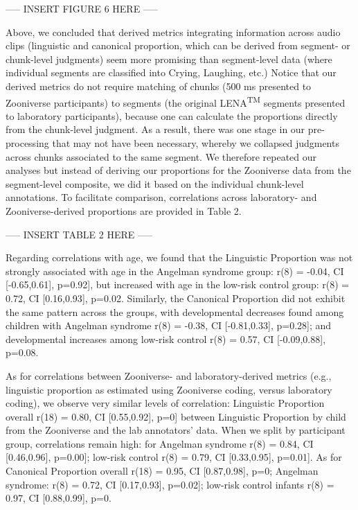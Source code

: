 \documentclass[english,,man]{apa6}
\begin{document}
----- INSERT FIGURE 6 HERE -----

Above, we concluded that derived metrics integrating information across audio clips (linguistic and canonical proportion, which can be derived from segment- or chunk-level judgments) seem more promising than segment-level data (where individual segments are classified into Crying, Laughing, etc.) Notice that our derived metrics do not require matching of chunks (500 ms presented to Zooniverse participants) to segments (the original LENA\textsuperscript{TM} segments presented to laboratory participants), because one can calculate the proportions directly from the chunk-level judgment. As a result, there was one stage in our pre-processing that may not have been necessary, whereby we collapsed judgments across chunks associated to the same segment. We therefore repeated our analyses but instead of deriving our proportions for the Zooniverse data from the segment-level composite, we did it based on the individual chunk-level annotations. To facilitate comparison, correlations across laboratory- and Zooniverse-derived proportions are provided in Table 2.

----- INSERT TABLE 2 HERE -----

Regarding correlations with age, we found that the Linguistic Proportion was not strongly associated with age in the Angelman syndrome group: r(8) = -0.04, CI {[}-0.65,0.61{]}, p=0.92{]}, but increased with age in the low-risk control group: r(8) = 0.72, CI {[}0.16,0.93{]}, p=0.02. Similarly, the Canonical Proportion did not exhibit the same pattern across the groups, with developmental decreases found among children with Angelman syndrome r(8) = -0.38, CI {[}-0.81,0.33{]}, p=0.28{]}; and developmental increases among low-risk control r(8) = 0.57, CI {[}-0.09,0.88{]}, p=0.08.

As for correlations between Zooniverse- and laboratory-derived metrics (e.g., linguistic proportion as estimated using Zooniverse coding, versus laboratory coding), we observe very similar levels of correlation: Linguistic Proportion overall r(18) = 0.80, CI {[}0.55,0.92{]}, p=0{]} between Linguistic Proportion by child from the Zooniverse and the lab annotators' data. When we split by participant group, correlations remain high: for Angelman syndrome r(8) = 0.84, CI {[}0.46,0.96{]}, p=0.00{]}; low-risk control r(8) = 0.79, CI {[}0.33,0.95{]}, p=0.01{]}. As for Canonical Proportion overall r(18) = 0.95, CI {[}0.87,0.98{]}, p=0; Angelman syndrome: r(8) = 0.72, CI {[}0.17,0.93{]}, p=0.02{]}; low-risk control infants r(8) = 0.97, CI {[}0.88,0.99{]}, p=0.
\end{document}
